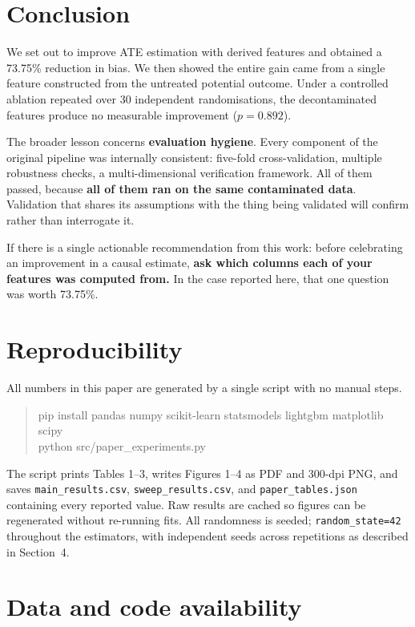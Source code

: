 \documentclass[11pt]{article}
\begin{document}
\section{Conclusion}

We set out to improve ATE estimation with derived features and obtained a 73.75\% reduction in bias. We then showed the entire gain came from a single feature constructed from the untreated potential outcome. Under a controlled ablation repeated over 30 independent randomisations, the decontaminated features produce no measurable improvement ($p = 0.892$).

The broader lesson concerns \textbf{evaluation hygiene}. Every component of the original pipeline was internally consistent: five-fold cross-validation, multiple robustness checks, a multi-dimensional verification framework. All of them passed, because \textbf{all of them ran on the same contaminated data}. Validation that shares its assumptions with the thing being validated will confirm rather than interrogate it.

If there is a single actionable recommendation from this work: before celebrating an improvement in a causal estimate, \textbf{ask which columns each of your features was computed from.} In the case reported here, that one question was worth 73.75\%.

\section*{Reproducibility}

All numbers in this paper are generated by a single script with no manual steps.
\begin{quote}
\ttfamily
pip install pandas numpy scikit-learn statsmodels lightgbm matplotlib scipy\\
python src/paper\_experiments.py
\end{quote}
The script prints Tables 1--3, writes Figures 1--4 as PDF and 300-dpi PNG, and saves \texttt{main\_results.csv}, \texttt{sweep\_results.csv}, and \texttt{paper\_tables.json} containing every reported value. Raw results are cached so figures can be regenerated without re-running fits. All randomness is seeded; \texttt{random\_state=42} throughout the estimators, with independent seeds across repetitions as described in Section~4.

\section*{Data and code availability}
\end{document}

